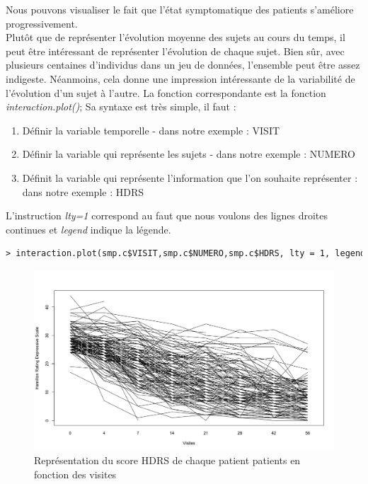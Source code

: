 Nous pouvons visualiser le fait que l'état symptomatique des patients s'améliore progressivement.\newline
\\
Plutôt que de représenter l'évolution moyenne des sujets au cours du temps, il peut être intéressant de représenter l'évolution de chaque sujet. Bien sûr, avec plusieurs centaines d'individus dans un jeu de données, l'ensemble peut être assez indigeste. Néanmoins, cela donne une impression intéressante de la variabilité de l'évolution d'un sujet à l'autre.\newline
La fonction correspondante est la fonction \textit{interaction.plot()}; Sa syntaxe est très simple, il faut : 
\begin{enumerate}
\item Définir la variable temporelle - dans notre exemple : VISIT
\item Définir la variable qui représente les sujets - dans notre exemple : NUMERO
\item Définit la variable qui représente l'information que l'on souhaite représenter : dans notre exemple : HDRS
\end{enumerate}
L'instruction \textit{lty=1} correspond au faut que nous voulons des lignes droites continues et \textit{legend} indique la légende.
\begin{lstlisting}[language=html]
> interaction.plot(smp.c$VISIT,smp.c$NUMERO,smp.c$HDRS, lty = 1, legend = FALSE)
\end{lstlisting}
\begin{figure}[H]\begin{center}\includegraphics[scale=0.4]{ilu/tp10.png}\caption{Représentation du score HDRS de chaque patient patients en fonction des visites}\end{center}\end{figure}
\newpage

